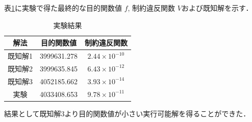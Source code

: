 \documentclass[twocolumn]{jarticle}
\begin{document}
表\ref{result}に実験で得た最終的な目的関数値 $f$, 制約違反関数 $V$および既知解を示す．
\begin{table}[htbp]
    \begin{center}
        \caption{実験結果}
        \label{result}
        \begin{tabular}{|c|c|c|}
            \hline
            解法 & 目的関数値 & 制約違反関数 \\ 
            \hline
            既知解1 & 3999631.278 & $2.44 \times 10^{-10}$ \\
            既知解2 & 3999635.845 & $6.43 \times 10^{-12}$ \\
            既知解3 & 4052185.662 & $3.93 \times 10^{-14}$ \\
            実験    & 4033408.653 & $9.78 \times 10^{-11}$ \\
            \hline
        \end{tabular}
    \end{center}
\end{table}
結果として既知解3より目的関数値が小さい実行可能解を得ることができた．
\end{document}

